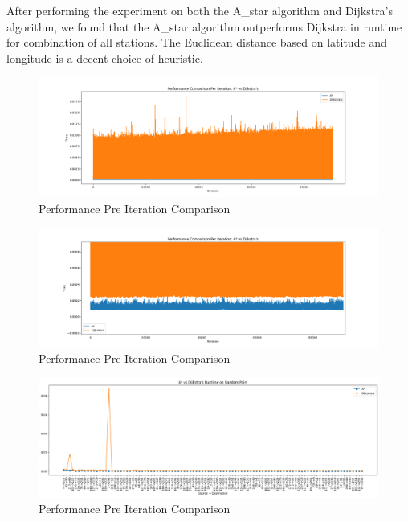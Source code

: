 \documentclass{article}
\begin{document}
\begin{onehalfspace}
After performing the experiment on both the A\_star algorithm and Dijkstra’s algorithm, we found that the A\_star algorithm outperforms Dijkstra in runtime for combination of all stations. The Euclidean distance based on latitude and longitude is a decent choice of heuristic. 

\newpage

\begin{figure}[H]  
\centering
\includegraphics[width=\textwidth]{part5_graph2.png}
\caption{Performance Pre Iteration Comparison}
\end{figure}

\begin{figure}[H]  
\centering
\includegraphics[width=\textwidth]{part5_graph3.png}
\caption{Performance Pre Iteration Comparison}
\end{figure}




\begin{figure}[H]  
\centering
\includegraphics[width=\textwidth]{part5_graph4.png}
\caption{Performance Pre Iteration Comparison}
\end{figure}


\end{onehalfspace}
\end{document}
